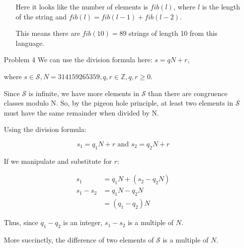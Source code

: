 \documentclass[12pt,letterpaper]{article}
\begin{document}
\begin{enumerate}
\begin{enumerate}
          Here it looks like the number of elements is $fib(l)$,
          where $l$ is the length of the string and $fib(l) = fib(l-1) + fib(l-2)$.

          This means there are $fib(10) = 89$ strings of length 10 from this language.

      \end{enumerate}

    \item[Problem 4]
      We can use the division formula here: $s = qN + r$,

      where $s \in \mathcal{S}, N = 314159265359, q, r \in \mathbb{Z}, q, r \ge 0$.

      Since $\mathcal{S}$ is infinite, we have more elements in $\mathcal{S}$ than there are congruence classes modulo N.
      So, by the pigeon hole principle, at least two elements in $\mathcal{S}$ must have the same remainder when divided by N.

      Using the division formula:

      \[s_1 = q_1N + r \text{ and } s_2 = q_2N + r\]

      If we manipulate and substitute for $r$:

      \begin{align*}
        s_1 &= q_1N + (s_2 - q_2N) \\
        s_1 - s_2 &= q_1N - q_2N \\
        &= (q_1 - q_2)N
      \end{align*}

      Thus, since $q_1 - q_2$ is an integer, $s_1 - s_2$ is a multiple of $N$.

      More succinctly, the difference of two elements of $\mathcal{S}$ is a multiple of $N$.
  \end{enumerate}
\end{document}
